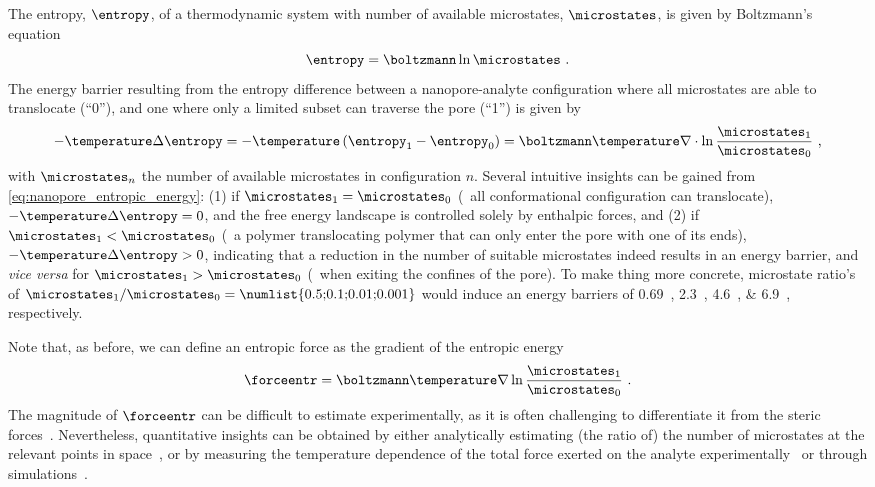 The entropy, $\entropy$, of a thermodynamic system with number of available microstates, $\microstates$, is
given by Boltzmann's equation~\cite{Neumann-1980}
%
\begin{equation}\label{eq:nanopores_entropy}
  \entropy = \boltzmann \ln \microstates \text{ .}
\end{equation}
%
The energy barrier resulting from the entropy difference between a nanopore-analyte configuration where all
microstates are able to translocate (``0''), and one where only a limited subset can traverse the pore (``1'')
is given by
%
\begin{equation}\label{eq:nanopore_entropic_energy}
  - \temperature \Delta \entropy = - \temperature \left( \entropy_1 - \entropy_0\right)
  = \boltzmann \temperature \nabla \cdot \ln \dfrac{\microstates_1}{\microstates_0}
  \text{ ,}
\end{equation}
%
with $\microstates_n$ the number of available microstates in configuration $n$. Several intuitive insights can
be gained from \cref{eq:nanopore_entropic_energy}: (1) if $\microstates_1 = \microstates_0$ (\eg~all
conformational configuration can translocate), $- \temperature \Delta \entropy = 0$, and the free energy
landscape is controlled solely by enthalpic forces, and (2) if $\microstates_1 < \microstates_0$ (\eg~a
polymer translocating polymer that can only enter the pore with one of its ends), $- \temperature \Delta
\entropy > 0$, indicating that a reduction in the number of suitable microstates indeed results in an energy
barrier, and \emph{vice versa} for $\microstates_1 > \microstates_0$ (\eg~when exiting the confines of the
pore). To make thing more concrete, microstate ratio's of $\microstates_1 / \microstates_0 =
\text{\numlist{0.5;0.1;0.01;0.001}}$ would induce an energy barriers of \SIlist{0.69;2.3;4.6;6.9}{\kbt},
respectively.

Note that, as before, we can define an entropic force as the gradient of the entropic
energy~\cite{Neumann-1980}
%
\begin{equation}\label{eq:nanopore_entropic_force}
  \forceentr = \boltzmann \temperature \nabla \ln \dfrac{\microstates_1}{\microstates_0}
  \text{ .}
\end{equation}
%
The magnitude of $\forceentr$ can be difficult to estimate experimentally, as it is often challenging to
differentiate it from the steric forces~\cite{Buchsbaum-2013}. Nevertheless, quantitative insights can be
obtained by either analytically estimating (the ratio of) the number of microstates at the relevant points in
space~\cite{Tian-2003,Muthukumar-2010,Cressiot-2015}, or by measuring the temperature dependence of the total
force exerted on the analyte experimentally~\cite{Meller-2002,Payet-2015} or through
simulations~\cite{Tian-2003,Matysiak-2006,Vaitheeswaran-2014,Luo-2017}.



